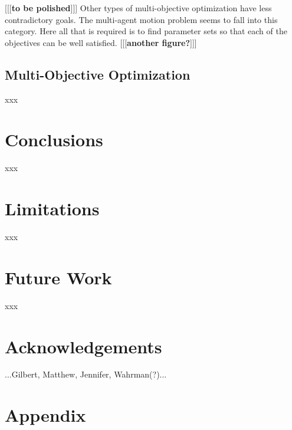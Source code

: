 \documentclass[letterpaper]{article}
\begin{document}
[[[\textbf{to be polished}]]] Other types of multi-objective optimization have less contradictory goals. The multi-agent motion problem seems to fall into this category. Here all that is required is to find parameter sets so that each of the objectives can be well satisfied. [[[\textbf{another figure?}]]]

\subsection{Multi-Objective Optimization}
\label{subsec:Multi-Objective}

xxx
\par

\section{Conclusions}
\label{sec:Conclusions}

xxx
\par

\section{Limitations}
\label{sec:limitations}

xxx
\par

\section{Future Work}
\label{sec:future}

xxx
\par

\section{Acknowledgements}
\label{sec:ack}

...Gilbert, Matthew, Jennifer, Wahrman(?)...
\par







\appendix
\onecolumn
\section{Appendix}
\label{sec:appendix}
\end{document}

